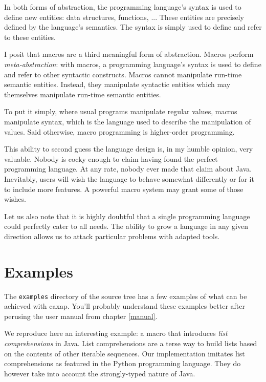 In both forms of abstraction, the programming language's syntax is used to
define new entities: data structures, functions, ... These entities are
precisely defined by the language's semantics. The syntax is simply used to
define and refer to these entities.

I posit that macros are a third meaningful form of abstraction. Macros perform
\emph{meta-abstraction}: with macros, a programming language's syntax is used to
define and refer to other syntactic constructs. Macros cannot manipulate
run-time semantic entities. Instead, they manipulate syntactic entities which
may themselves manipulate run-time semantic entities.

To put it simply, where usual programs manipulate regular values, macros
manipulate syntax, which is the language used to describe the manipulation of
values. Said otherwise, macro programming is higher-order programming.

This ability to second guess the language design is, in my humble opinion, very
valuable. Nobody is cocky enough to claim having found the perfect programming
language. At any rate, nobody ever made that claim about Java. Inevitably, users
will wish the language to behave somewhat differently or for it to include more
features. A powerful macro system may grant some of those wishes.

Let us also note that it is highly doubtful that a single programming language
could perfectly cater to all needs. The ability to grow a language in any given
direction allows us to attack particular problems with adapted tools.

\section{Examples}

The \texttt{examples} directory of the source tree has a few examples of what
can be achieved with caxap. You'll probably understand these examples better
after perusing the user manual from chapter \ref{manual}.

We reproduce here an interesting example: a macro that introduces \emph{list
  comprehensions} in Java. List comprehensions are a terse way to build lists
based on the contents of other iterable sequences. Our implementation imitates
list comprehensions as featured in the Python programming
language. \cite{listcomp} They do however take into account the strongly-typed
nature of Java.

